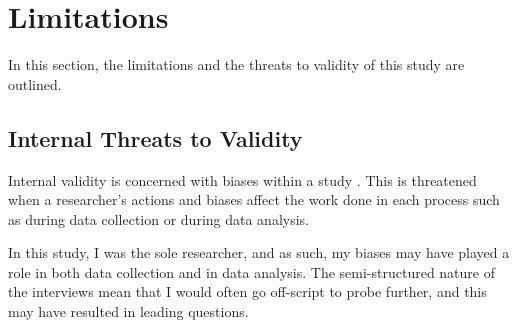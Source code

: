


\section{Limitations}
In this section, the limitations and the threats to validity of this study are outlined.

\subsection{Internal Threats to Validity}
Internal validity is concerned with biases within a study \cite{creswell2013research}. This is threatened when a researcher's actions and biases affect the work done in each process such as during data collection or during data analysis.

In this study, I was the sole researcher, and as such, my biases may have played a role in both data collection and in data analysis. The semi-structured nature of the interviews mean that I would often go off-script to probe further, and this may have resulted in leading questions.

